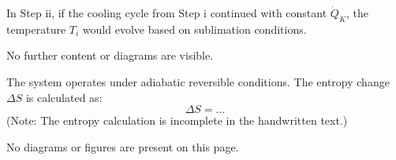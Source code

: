 In Step ii, if the cooling cycle from Step i continued with constant \( \dot{Q}_K \), the temperature \( T_i \) would evolve based on sublimation conditions.  

No further content or diagrams are visible.

The system operates under adiabatic reversible conditions. The entropy change \( \Delta S \) is calculated as:  
\[
\Delta S = ...
\]  
(Note: The entropy calculation is incomplete in the handwritten text.)  

No diagrams or figures are present on this page.